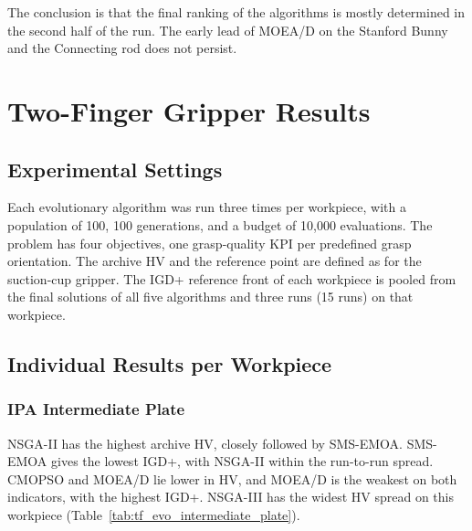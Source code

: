 The conclusion is that the final ranking of the algorithms is mostly determined in the second
half of the run. The early lead of MOEA/D on the Stanford Bunny and the Connecting rod does not
persist.

\section{Two-Finger Gripper Results}
\label{sec:results_tf}

\subsection{Experimental Settings}
\label{subsec:results_tf_settings}

Each evolutionary algorithm was run three times per workpiece, with a population of 100,
100 generations, and a budget of 10,000 evaluations. The problem has four objectives, one
grasp-quality KPI per predefined grasp orientation. The archive HV and the reference point are
defined as for the suction-cup gripper. The IGD+ reference front of each workpiece is pooled from
the final solutions of all five algorithms and three runs (15 runs) on that workpiece.

\subsection{Individual Results per Workpiece}
\label{subsec:results_tf_individual}

\subsubsection{IPA Intermediate Plate}
\label{subsubsec:results_tf_ipa}

NSGA-II has the highest archive HV, closely followed by SMS-EMOA. SMS-EMOA gives the lowest
IGD+, with NSGA-II within the run-to-run spread. CMOPSO and MOEA/D lie lower in HV, and MOEA/D
is the weakest on both indicators, with the highest IGD+. NSGA-III has the widest HV spread on
this workpiece (Table~\ref{tab:tf_evo_intermediate_plate}).

